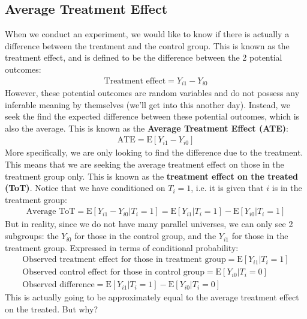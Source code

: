 \documentclass{article}
\begin{document}
\subsection{Average Treatment Effect}
When we conduct an experiment, we would like to know if there is actually a difference between the treatment and the control group.
This is known as the treatment effect, and is defined to be the difference between the 2 potential outcomes:
\begin{gather*}
    \text{Treatment effect} = Y_{i1} - Y_{i0}
\end{gather*}
However, these potential outcomes are random variables and do not possess any inferable meaning by themselves (we'll get into this another day).
Instead, we seek the find the expected difference between these potential outcomes, which is also the average.
This is known as the \textbf{Average Treatment Effect (ATE)}:
\begin{gather*}
    \text{ATE} = \text{E}[Y_{i1} - Y_{i0}]
\end{gather*}
More specifically, we are only looking to find the difference due to the treatment.
This means that we are seeking the average treatment effect on those in the treatment group only.
This is known as the \textbf{treatment effect on the treated (ToT)}.
Notice that we have conditioned on $T_i=1$, i.e. it is given that $i$ is in the treatment group:
\begin{gather*}
    \text{Average ToT} = \text{E}[Y_{i1} - Y_{i0} | T_i = 1] = \text{E}[Y_{i1} | T_i = 1] - \text{E}[Y_{i0} | T_i = 1] %
\end{gather*}
But in reality, since we do not have many parallel universes, we can only see 2 subgroups: the $Y_{i0}$ for those in the control group, and the $Y_{i1}$ for those in the treatment group.
Expressed in terms of conditional probability:
\begin{gather*}
    \text{Observed treatment effect for those in treatment group} = \text{E}[Y_{i1}|T_i = 1]\\
    \text{Observed control effect for those in control group} = \text{E}[Y_{i0}|T_i = 0]\\
    \text{Observed difference} = \text{E}[Y_{i1}|T_i = 1] - \text{E}[Y_{i0}|T_i = 0]
\end{gather*}
This is actually going to be approximately equal to the average treatment effect on the treated.
But why?
\end{document}
